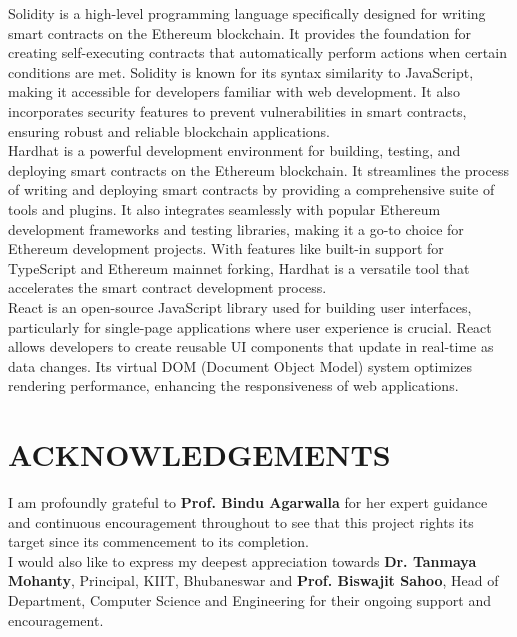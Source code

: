 \documentclass[12pt,a4paper]{article}
\begin{document}
Solidity is a high-level programming language specifically designed for writing smart contracts on the Ethereum blockchain. It provides the foundation for creating self-executing contracts that automatically perform actions when certain conditions are met. Solidity is known for its syntax similarity to JavaScript, making it accessible for developers familiar with web development. It also incorporates security features to prevent vulnerabilities in smart contracts, ensuring robust and reliable blockchain applications.\\

Hardhat is a powerful development environment for building, testing, and deploying smart contracts on the Ethereum blockchain. It streamlines the process of writing and deploying smart contracts by providing a comprehensive suite of tools and plugins. It also integrates seamlessly with popular Ethereum development frameworks and testing libraries, making it a go-to choice for Ethereum development projects. With features like built-in support for TypeScript and Ethereum mainnet forking, Hardhat is a versatile tool that accelerates the smart contract development process.\cite{hardhat}\\

React is an open-source JavaScript library used for building user interfaces, particularly for single-page applications where user experience is crucial. React allows developers to create reusable UI components that update in real-time as data changes. Its virtual DOM (Document Object Model) system optimizes rendering performance, enhancing the responsiveness of web applications.\cite{react}



\newpage
\section*{\huge ACKNOWLEDGEMENTS}

I am profoundly grateful to \textbf{Prof. Bindu Agarwalla} for her expert guidance
and continuous encouragement throughout to see that this project rights its
target since its commencement to its completion.\\

I would also like to express my deepest appreciation towards \textbf{Dr. Tanmaya Mohanty},
Principal, KIIT, Bhubaneswar and \textbf{Prof. Biswajit Sahoo}, 
Head of Department, Computer Science and Engineering for their ongoing support and encouragement.\\
\end{document}
